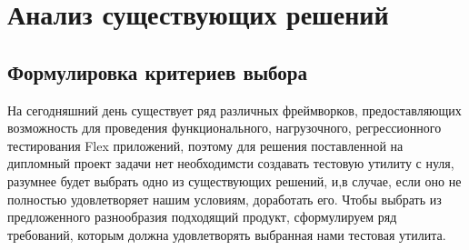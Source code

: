 \chapter*{Анализ существующих решений} 

\section*{Формулировка критериев выбора}
 
На сегодняшний день существует ряд различных фреймворков, предоставляющих 
возможность для проведения функционального, нагрузочного, регрессионного 
тестирования Flex приложений, поэтому для решения поставленной на дипломный
проект задачи нет необходимсти создавать тестовую утилиту с нуля, разумнее 
будет выбрать одно из существующих решений, и,в случае, если оно не полностью 
удовлетворяет нашим условиям, доработать его. Чтобы выбрать из предложенного 
разнообразия подходящий продукт, сформулируем ряд требований, 
которым должна удовлетворять выбранная нами тестовая утилита.

